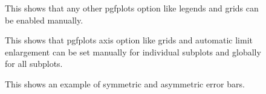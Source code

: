 \documentclass[a4paper,11pt]{article}
\begin{document}
\begin{figure}
\centering

\caption{This shows that any other pgfplots option like legends and
         grids can be enabled manually.}
\end{figure}

\begin{figure}
\centering

\caption{This shows that pgfplots axis option like grids and automatic
         limit enlargement can be set manually for individual subplots
         and globally for all subplots.}
\end{figure}

\begin{figure}
\centering

\caption{This shows an example of symmetric and asymmetric error bars.}
\end{figure}
\end{document}
